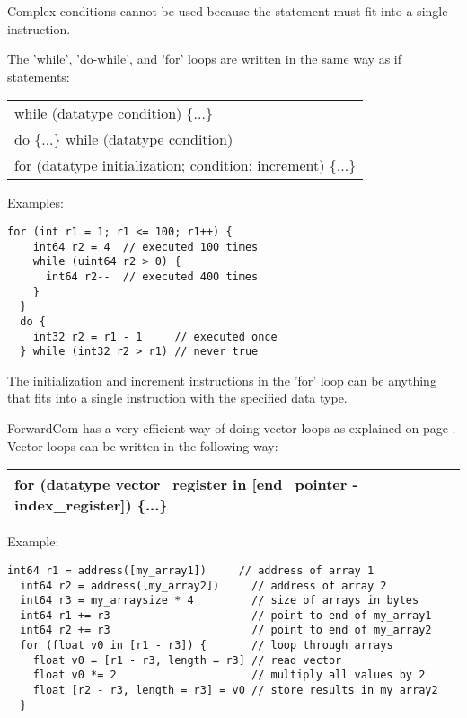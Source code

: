 \documentclass[forwardcom.tex]{subfiles}
\begin{document}
Complex conditions cannot be used because the statement must fit into a single instruction.
\vv

The 'while', 'do-while', and 'for' loops are written in the same way as if statements:

\begin{tabular}{|p{150mm}|}
\hline
\hspace{4mm} while (datatype condition) \{...\}\\
\hspace{4mm} do \{...\} while (datatype condition) \\
\hspace{4mm} for (datatype initialization; condition; increment) \{...\}\\
\hline
\end{tabular}
\vv

Examples:
\vv

\begin{lstlisting}[frame=single]
  for (int r1 = 1; r1 <= 100; r1++) {
    int64 r2 = 4  // executed 100 times
    while (uint64 r2 > 0) {
      int64 r2--  // executed 400 times
    }
  } 
  do {
    int32 r2 = r1 - 1     // executed once
  } while (int32 r2 > r1) // never true
\end{lstlisting}
\vv

The initialization and increment instructions in the 'for' loop can be anything that fits into a single instruction with the specified data type.
\vspace{4mm}

\label{vectorLoopSyntax}
ForwardCom has a very efficient way of doing vector loops as explained on page \pageref{vectorLoops}. Vector loops can be written in the following way:

\begin{tabular}{|p{150mm}|}
\hline
\hspace{4mm} for (datatype vector\_register in [end\_pointer - index\_register]) \{...\}\\
\hline
\end{tabular}
\vspace{4mm}

Example:

\begin{lstlisting}[frame=single]
  int64 r1 = address([my_array1])     // address of array 1
  int64 r2 = address([my_array2])     // address of array 2
  int64 r3 = my_arraysize * 4         // size of arrays in bytes
  int64 r1 += r3                      // point to end of my_array1
  int64 r2 += r3                      // point to end of my_array2
  for (float v0 in [r1 - r3]) {       // loop through arrays
    float v0 = [r1 - r3, length = r3] // read vector
    float v0 *= 2                     // multiply all values by 2
    float [r2 - r3, length = r3] = v0 // store results in my_array2
  }
\end{lstlisting}
\vv
\end{document}
